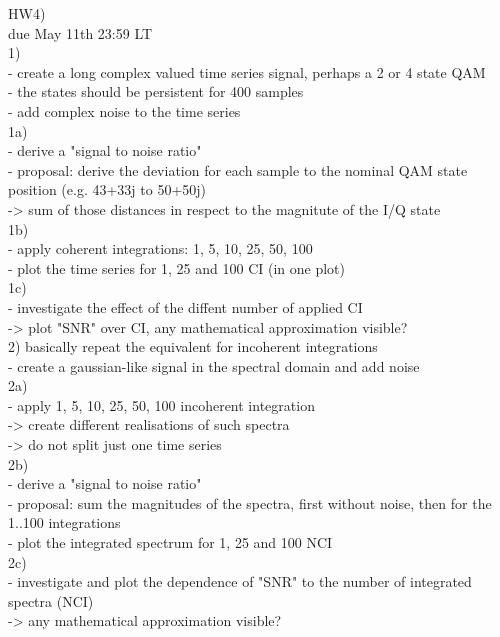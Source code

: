 \begin{taskspec}
HW4)\\

due May 11th 23:59 LT\\

1)\\
- create a long complex valued time series signal, perhaps a 2 or 4 state QAM\\
- the states should be persistent for 400 samples\\
- add complex noise to the time series\\

1a)\\
- derive a "signal to noise ratio"\\
- proposal: derive the deviation for each sample to the nominal QAM state position (e.g. 43+33j to 50+50j)\\
	-> sum of those distances in respect to the magnitute of the I/Q state\\

1b)\\
- apply coherent integrations: 1, 5, 10, 25, 50, 100\\
- plot the time series for 1, 25 and 100 CI (in one plot)\\

1c)\\
- investigate the effect of the diffent number of applied CI\\
-> plot "SNR" over CI, any mathematical approximation visible?\\

2) basically repeat the equivalent for incoherent integrations\\
- create a gaussian-like signal in the spectral domain and add noise\\

2a)\\
- apply 1, 5, 10, 25, 50, 100 incoherent integration\\
-> create different realisations of such spectra\\
-> do not split just one time series\\

2b)\\
- derive a "signal to noise ratio"\\
- proposal: sum the magnitudes of the spectra, first without noise, then for the 1..100 integrations\\
- plot the integrated spectrum for 1, 25 and 100 NCI\\

2c)\\
- investigate and plot the dependence of "SNR" to the number of integrated spectra (NCI)\\
-> any mathematical approximation visible?\\
\end{taskspec}
